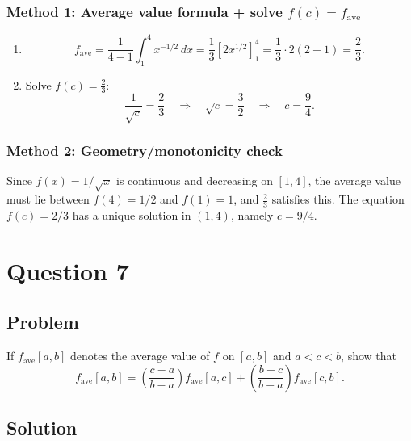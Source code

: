 \documentclass[12pt]{article}
\begin{document}
\subsubsection*{Method 1: Average value formula + solve \(f(c)=f_{\text{ave}}\)}

\begin{enumerate}[label=(\roman*)]
\item
\[
f_{\text{ave}}=\frac{1}{4-1}\int_{1}^{4}x^{-1/2}\,dx
=\frac{1}{3}\left[2x^{1/2}\right]_{1}^{4}
=\frac{1}{3}\cdot 2(2-1)=\frac{2}{3}.
\]

\item Solve \(f(c)=\frac{2}{3}\):
\[
\frac{1}{\sqrt{c}}=\frac{2}{3}
\quad\Rightarrow\quad
\sqrt{c}=\frac{3}{2}
\quad\Rightarrow\quad
c=\frac{9}{4}.
\]
\end{enumerate}

\subsubsection*{Method 2: Geometry/monotonicity check}

Since \(f(x)=1/\sqrt{x}\) is continuous and decreasing on \([1,4]\), the average value must lie between \(f(4)=1/2\) and \(f(1)=1\), and \(\frac{2}{3}\) satisfies this. The equation \(f(c)=2/3\) has a unique solution in \((1,4)\), namely \(c=9/4\).

\bigskip


\newpage

\section*{Question 7}

\subsection*{Problem}

If \(f_{\text{ave}}[a,b]\) denotes the average value of \(f\) on \([a,b]\) and \(a<c<b\), show that
\[
f_{\text{ave}}[a,b]
=\left(\frac{c-a}{b-a}\right)f_{\text{ave}}[a,c]
+\left(\frac{b-c}{b-a}\right)f_{\text{ave}}[c,b].
\]

\subsection*{Solution}
\end{document}
